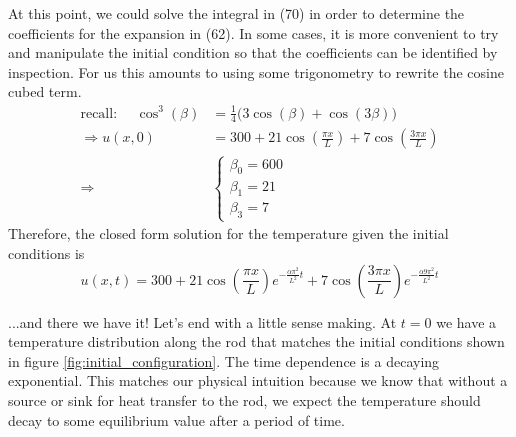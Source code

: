 \documentclass[a4paper, 11pt]{article}
\newenvironment{solution}{%
	\begin{list}{}{%
			\setlength{\topsep}{0pt}%
			\setlength{\leftmargin}{0.5cm}%
			\setlength{\rightmargin}{0.5cm}%
			\setlength{\listparindent}{\parindent}%
			\setlength{\itemindent}{\parindent}%
			\setlength{\parsep}{\parskip}%
		}%
		\item[]}{\end{list}}
\begin{document}
\begin{enumerate}[leftmargin=0em]
\begin{solution}
        
        At this point, we could solve the integral in (70) in order to
        determine the coefficients for the expansion in (62). In some cases, it
        is more convenient to try and manipulate the initial condition so that the
        coefficients can be identified by inspection. For us this amounts to
        using some trigonometry to rewrite the cosine cubed term.
        \begin{align}
          \text{recall: }\quad \cos^3(\beta)&= \frac{1}{4}\Big(3\cos(\beta)+\cos(3\beta)\Big) \\
          \Rightarrow u(x,0)&= 300+21\cos\left(\frac{\pi x}{L}\right)+7\cos\left( \frac{3\pi x}{L} \right)\\
          \Rightarrow &\begin{cases}
            \beta_0 = 600 \\
            \beta_1 = 21 \\
            \beta_3 = 7
            \end{cases}
        \end{align}
        Therefore, the closed form solution for the temperature given the
        initial conditions is
        \begin{equation}
          u(x,t)= 300+21\cos\left( \frac{\pi x}{L} \right)e^{-\frac{\alpha\pi^2}{L^2}t}+7\cos\left( \frac{3 \pi x}{L} \right)e^{-\frac{\alpha 9\pi^2}{L^2}t}
        \end{equation}

        ...and there we have it! Let's end with a little sense making. At $t=0$
        we have a temperature distribution along the rod that matches the
        initial conditions shown in figure \ref{fig:initial_configuration}. The
        time dependence is a decaying exponential. This matches our physical
        intuition because we know that without a source or sink for heat
        transfer to the rod, we expect the temperature should decay to some
        equilibrium value after a period of time.
      \end{solution}


\end{enumerate}
\end{document}
